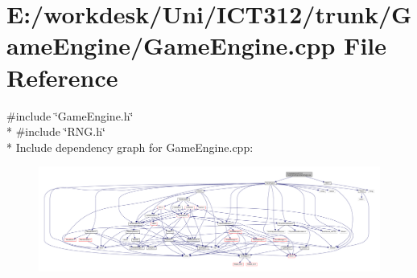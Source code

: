 \section{E\+:/workdesk/\+Uni/\+I\+C\+T312/trunk/\+Game\+Engine/\+Game\+Engine.cpp File Reference}
\label{_game_engine_8cpp}
{\ttfamily \#include \char`\"{}Game\+Engine.\+h\char`\"{}}\\*
{\ttfamily \#include \char`\"{}R\+N\+G.\+h\char`\"{}}\\*
Include dependency graph for Game\+Engine.\+cpp\+:\nopagebreak
\begin{figure}[H]
\begin{center}
\leavevmode
\includegraphics[width=350pt]{d1/dbc/_game_engine_8cpp__incl}
\end{center}
\end{figure}
